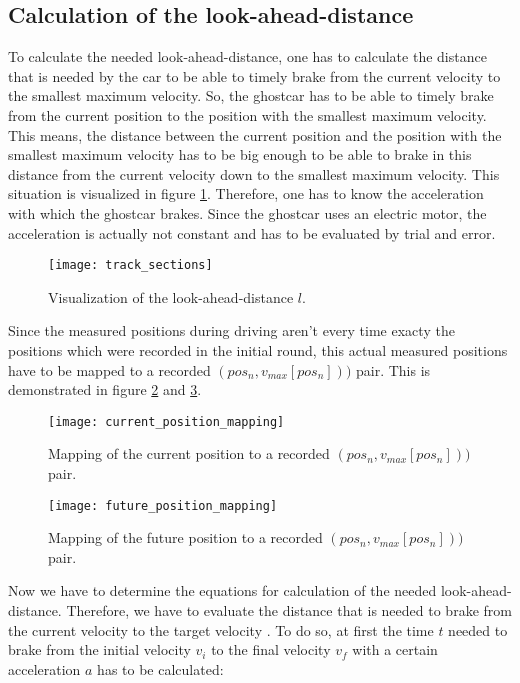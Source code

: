 \subsection{Calculation of the look-ahead-distance}

To calculate the needed look-ahead-distance, one has to calculate the distance that is needed by the car to be able to timely brake from the current velocity
to the smallest maximum velocity. So, the ghostcar has to be able to timely brake from the current position to the position with the smallest maximum velocity.
This means, the distance between the current position and the position with the smallest maximum velocity has to be big enough to be able to brake in this
distance from the current velocity down to the smallest maximum velocity. This situation is visualized in figure \ref{fig:TrackSections}. Therefore, one has to
know the acceleration with which the ghostcar brakes. Since the ghostcar uses an electric motor, the acceleration is actually not constant and has to be
evaluated by trial and error.

\begin{figure}[h]
\centering
\texttt{[image: track\_sections]}
\caption{Visualization of the look-ahead-distance $l$.}
\label{fig:TrackSections}
\end{figure}

Since the measured positions during driving aren't every time exacty the positions which were recorded in the initial round, this actual measured positions have
to be mapped to a recorded $(pos_{n}, v_{max}[pos_{n}]))$ pair. This is demonstrated in figure \ref{fig:CurrentPositionMapping} and
\ref{fig:FuturePositionMapping}.

\begin{figure}[h]
\centering
\texttt{[image: current\_position\_mapping]}
\caption{Mapping of the current position to a recorded $(pos_{n}, v_{max}[pos_{n}]))$ pair.}
\label{fig:CurrentPositionMapping}
\end{figure}

\begin{figure}[h]
\centering
\texttt{[image: future\_position\_mapping]}
\caption{Mapping of the future position to a recorded $(pos_{n}, v_{max}[pos_{n}]))$ pair.}
\label{fig:FuturePositionMapping}
\end{figure}

Now we have to determine the equations for calculation of the needed look-ahead-distance. Therefore, we have to evaluate the distance that is needed to brake
from the current velocity to the target velocity \cite{TimeAndDistanceCalculationFromAcceleration}. To do so, at first the time $t$ needed to brake from the
initial velocity $v_{i}$ to the final velocity $v_{f}$ with a certain acceleration $a$ has to be calculated:

